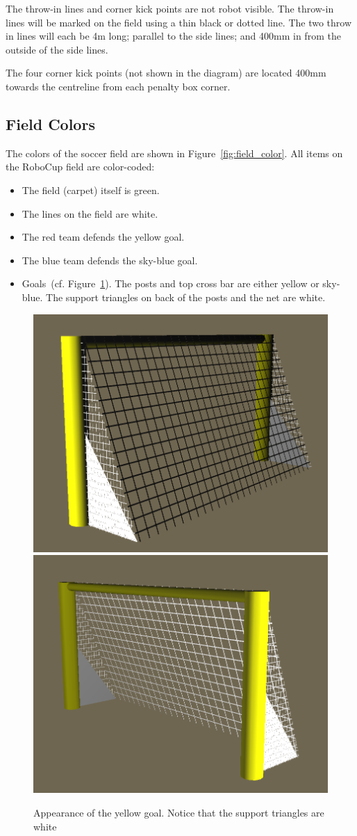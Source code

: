 \documentclass[12pt]{article}
\newcommand{\cf}{\mbox{cf.}\xspace}
\begin{document}
The throw-in lines and corner kick points are not robot visible. The throw-in lines will be marked on the field using a
thin black or dotted line. The two throw in lines will each be 4m long; parallel to the side lines; and 400mm in from the outside of the side lines.

The four corner kick points (not shown in the diagram) are located 400mm towards the centreline from each penalty box corner.

\subsection{Field Colors}

The colors of the soccer field are shown in
Figure~\ref{fig:field_color}. All items on the RoboCup field are
color-coded:

\begin{itemize}
\item The field (carpet) itself is green.
\item The lines on the field are white.
\item The red team defends the yellow goal.
\item The blue team defends the sky-blue goal.
\item Goals~(\cf Figure~\ref{fig:goal_colors}). The posts and top cross
  bar are either yellow or sky-blue. The support triangles on back of the posts and the net are white.
\end{itemize}

\begin{figure}[htp]
\begin{center}
    \leavevmode
    \includegraphics[width=0.45\columnwidth]{figs/GoalBack}
    \includegraphics[width=0.45\columnwidth]{figs/GoalFront}
    \caption{Appearance of the yellow goal. Notice that the support triangles are white}
    \label{fig:goal_colors}
\end{center}
\end{figure}
\end{document}
